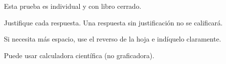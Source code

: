 \documentclass{emate-ucr}
\begin{document}
\imprimirtitulo

\datosestudiante

\begin{instrucciones}
  \item Esta prueba es individual y con libro cerrado.
  \item Justifique cada respuesta. Una respuesta sin justificación no se
        calificará.
  \item Si necesita más espacio, use el reverso de la hoja e indíquelo
        claramente.
  \item Puede usar calculadora científica (no graficadora).
\end{instrucciones}
\end{document}
